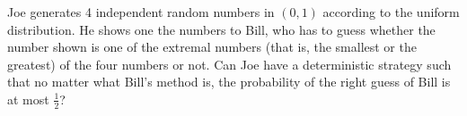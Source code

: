 Joe generates 4 independent random numbers in $(0,1)$ according to the uniform distribution. He shows one the numbers to Bill, who has to guess whether the number shown is one of the extremal numbers (that is, the smallest or the greatest) of the four numbers or not. Can Joe have a deterministic strategy such that no matter what Bill's method is, the probability of the right guess of Bill is at most $\frac12$?